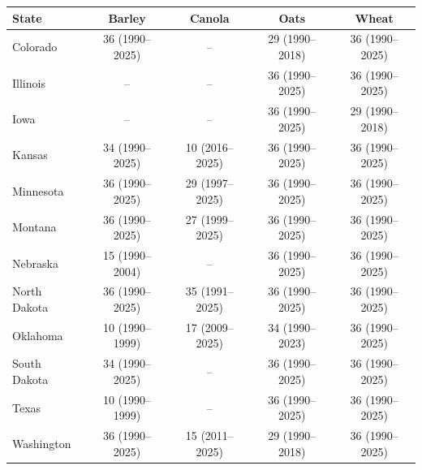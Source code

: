 \begin{tabular}{lcccc}
\toprule
State & Barley & Canola & Oats & Wheat \\
\midrule
Colorado & 36 (1990--2025) & -- & 29 (1990--2018) & 36 (1990--2025) \\
Illinois & -- & -- & 36 (1990--2025) & 36 (1990--2025) \\
Iowa & -- & -- & 36 (1990--2025) & 29 (1990--2018) \\
Kansas & 34 (1990--2025) & 10 (2016--2025) & 36 (1990--2025) & 36 (1990--2025) \\
Minnesota & 36 (1990--2025) & 29 (1997--2025) & 36 (1990--2025) & 36 (1990--2025) \\
Montana & 36 (1990--2025) & 27 (1999--2025) & 36 (1990--2025) & 36 (1990--2025) \\
Nebraska & 15 (1990--2004) & -- & 36 (1990--2025) & 36 (1990--2025) \\
North Dakota & 36 (1990--2025) & 35 (1991--2025) & 36 (1990--2025) & 36 (1990--2025) \\
Oklahoma & 10 (1990--1999) & 17 (2009--2025) & 34 (1990--2023) & 36 (1990--2025) \\
South Dakota & 34 (1990--2025) & -- & 36 (1990--2025) & 36 (1990--2025) \\
Texas & 10 (1990--1999) & -- & 36 (1990--2025) & 36 (1990--2025) \\
Washington & 36 (1990--2025) & 15 (2011--2025) & 29 (1990--2018) & 36 (1990--2025) \\
\bottomrule
\end{tabular}
